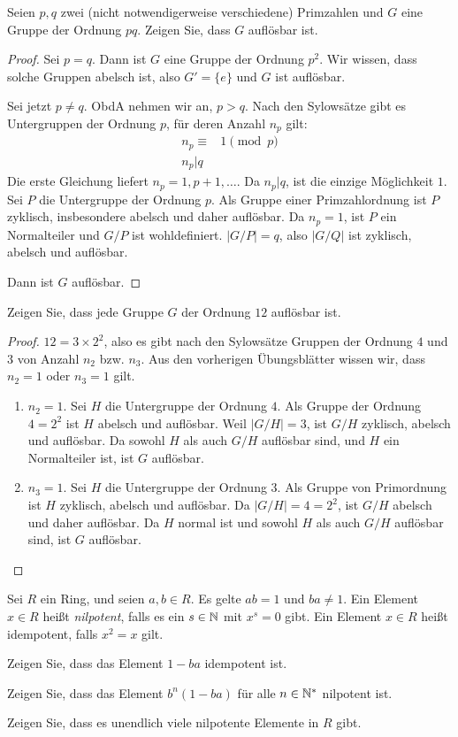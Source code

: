 \begin{Problem}
	Seien $p,q$ zwei (nicht notwendigerweise verschiedene) Primzahlen und $G$ eine Gruppe der Ordnung $pq$. Zeigen Sie, dass $G$ auflösbar ist.  
\end{Problem}
\begin{proof}
	Sei $p=q$. Dann ist $G$ eine Gruppe der Ordnung $p^2$. Wir wissen, dass solche Gruppen abelsch ist, also $G'=\{e\} $ und $G$ ist auflösbar.

	Sei jetzt $p\neq q$. ObdA nehmen wir an, $p>q$. Nach den Sylowsätze gibt es Untergruppen der Ordnung $p$, f\"{u}r deren Anzahl $n_p$ gilt:
	\begin{align*}
		n_p\equiv& 1\pmod{p}\\
		n_p|q
	\end{align*}
	Die erste Gleichung liefert $n_p=1,p+1,\dots$. Da $n_p|q$, ist die einzige Möglichkeit $1$. Sei $P$ die Untergruppe der Ordnung $p$. Als Gruppe einer Primzahlordnung ist $P$ zyklisch, insbesondere abelsch und daher auflösbar. Da $n_p=1$, ist $P$ ein Normalteiler und $G / P$ ist wohldefiniert. $|G / P|=q$, also $|G / Q|$ ist zyklisch, abelsch und auflösbar. 

	Dann ist $G$ auflösbar.
\end{proof}
\begin{Problem}
	Zeigen Sie, dass jede Gruppe $G$ der Ordnung $12$ auflösbar ist.
\end{Problem}
\begin{proof}
	$12=3\times 2^2$, also es gibt nach den Sylowsätze Gruppen der Ordnung $4$ und $3$ von Anzahl $n_2$ bzw. $n_3$. Aus den vorherigen Übungsblätter wissen wir, dass $n_2= 1$ oder $n_3=1$ gilt. 
	\begin{enumerate}
		\item $n_2=1$. Sei $H$ die Untergruppe der Ordnung $4$. Als Gruppe der Ordnung $4=2^2$ ist $H$ abelsch und auflösbar. Weil $|G / H|=3$, ist $G / H$ zyklisch, abelsch und auflösbar. Da sowohl $H$ als auch $G / H$ auflösbar sind, und $H$ ein Normalteiler ist, ist $G$ auflösbar.
		\item $n_3=1$. Sei $H$ die Untergruppe der Ordnung $3$. Als Gruppe von Primordnung ist $H$ zyklisch, abelsch und auflösbar. Da $|G / H|=4=2^2$, ist $G / H$ abelsch und daher auflösbar. Da $H$ normal ist und sowohl $H$ als auch $G / H$ auflösbar sind, ist $G$ auflösbar.\qedhere 
	\end{enumerate}
\end{proof}
\begin{Problem}
	Sei $R$ ein Ring, und seien $a,b\in R$. Es gelte $ab=1$ und $ba\neq 1$. Ein Element $x\in R$ heißt \emph{nilpotent}, falls es ein $s\in \mathbb{N}$ mit $x^s=0$ gibt. Ein Element $x\in R$ heißt idempotent, falls $x^2=x$ gilt.
	\begin{parts}
		\item Zeigen Sie, dass das Element $1-ba$ idempotent ist.
		\item Zeigen Sie, dass das Element $b^n(1-ba)$ f\"{u}r alle $n\in \mathbb{N}^*$ nilpotent ist.
		\item Zeigen Sie, dass es unendlich viele nilpotente Elemente in $R$ gibt.
	\end{parts}
\end{Problem}
